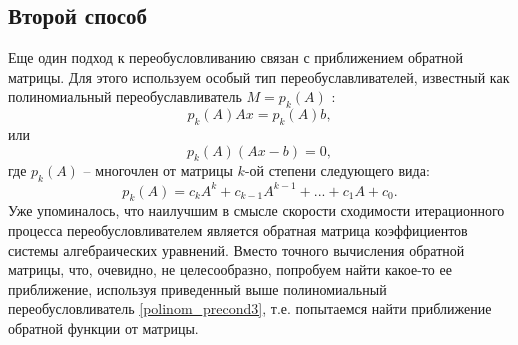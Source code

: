 \documentclass[a4paper,14pt]{extreport}
\begin{document}
  \subsection{Второй способ}
  \label{ss:precond_2}
  Еще один подход  к переобусловливанию связан с приближением обратной матрицы. Для этого используем особый тип переобуславливателей, известный как полиномиальный переобуславливатель $M=p_k(A)$ \cite{chen}:
	 \begin{equation}
	\label{polinom_precond1}
	p_k(A)Ax=p_k(A)b,
	\end{equation}
или
	 \begin{equation}
	\label{polinom_precond2}
	p_k(A)(Ax- b)=0,
	\end{equation}
где $p_k(A)$ -- многочлен от матрицы $k$-ой степени следующего вида:
	 \begin{equation}
	\label{polinom_precond3}
	p_k(A)=c_kA^k + c_{k-1}A^{k-1} + ... + c_1A+c_0.
	\end{equation}
Уже упоминалось, что наилучшим в смысле скорости сходимости итерационного процесса переобусловливателем является обратная матрица коэффициентов системы алгебраических уравнений. Вместо точного вычисления обратной матрицы, что, очевидно,  не целесообразно, попробуем найти какое-то ее приближение, используя приведенный выше полиномиальный переобусловливатель \eqref{polinom_precond3}, т.е. попытаемся найти приближение обратной функции от матрицы.
\end{document}

